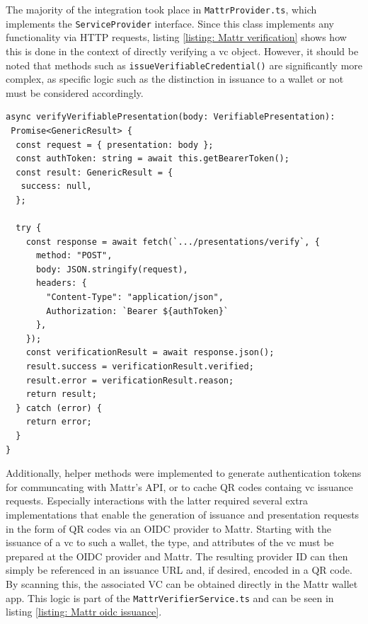         The majority of the integration took place in \texttt{MattrProvider.ts}, which implements the \texttt{ServiceProvider} interface. Since this class implements any functionality via HTTP requests, listing \ref{listing: Mattr verification} shows how this is done in the context of directly verifying a \ac{vc} object. However, it should be noted that methods such as \texttt{issueVerifiableCredential()} are significantly more complex, as specific logic such as the distinction in issuance to a wallet or not must be considered accordingly.
        \newline

\begin{lstlisting}[style=ES6, caption=Example of Mattr verification implementation, label={listing: Mattr verification}]
async verifyVerifiablePresentation(body: VerifiablePresentation): 
 Promise<GenericResult> {
  const request = { presentation: body };
  const authToken: string = await this.getBearerToken();
  const result: GenericResult = {
   success: null,
  };

  try {
    const response = await fetch(`.../presentations/verify`, {
      method: "POST",
      body: JSON.stringify(request),
      headers: { 
        "Content-Type": "application/json", 
        Authorization: `Bearer ${authToken}` 
      },
    });
    const verificationResult = await response.json();
    result.success = verificationResult.verified;
    result.error = verificationResult.reason;
    return result;
  } catch (error) {
    return error;
  }
}\end{lstlisting}
    
    Additionally, helper methods were implemented to generate authentication tokens for communcating with Mattr's API, or to cache QR codes containg \ac{vc} issuance requests. Especially interactions with the latter required several extra implementations that enable the generation of issuance and presentation requests in the form of QR codes via an OIDC provider to Mattr. Starting with the issuance of a \ac{vc} to such a wallet, the type, and attributes of the \ac{vc} must be prepared at the OIDC provider and Mattr. The resulting provider ID can then simply be referenced in an issuance URL and, if desired, encoded in a QR code. By scanning this, the associated VC can be obtained directly in the Mattr wallet app. This logic is part of the \texttt{MattrVerifierService.ts} and can be seen in listing \ref{listing: Mattr oidc issuance}.
    \newline
    

